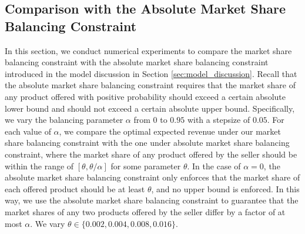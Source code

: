 \documentclass[mnsc,non-blindrev]{informs3}
\theoremstyle{definition}
\begin{document}
{\subsection{Comparison with the Absolute Market Share Balancing Constraint}

In this section, we conduct numerical experiments to compare the market share balancing constraint with the absolute market share balancing constraint introduced in the model discussion in Section \ref{sec:model_discussion}. Recall that the absolute market share balancing constraint requires that the market share of any product offered with positive probability should exceed a certain absolute lower bound and should not exceed a certain absolute upper bound. Specifically, we vary the balancing parameter $\alpha$ from $0$ to $0.95$ with a stepsize of $0.05$. For each value of $\alpha$, we compare the optimal expected revenue under our market share balancing constraint with the one under absolute market share balancing constraint, where the market share of any product offered by the seller should be within the range of $[\theta,\theta/\alpha]$ for some parameter $\theta$. In the case of $\alpha=0$, the absolute market share balancing constraint only enforces that the market share of each offered product should be at least $\theta$, and no upper bound is enforced. In this way, we use the absolute market share balancing constraint to guarantee that the market shares of any two products offered by the seller differ by a factor of at most $\alpha$. We vary $\theta\in\{0.002,0.004,0.008,0.016\}$.

}
\end{document}
